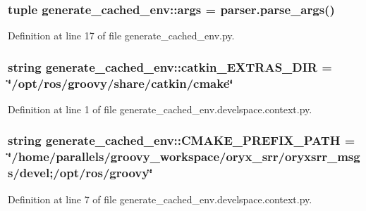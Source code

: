 \subsubsection[{args}]{\setlength{\rightskip}{0pt plus 5cm}tuple {\bf generate\-\_\-cached\-\_\-env\-::args} = parser.\-parse\-\_\-args()}\label{namespacegenerate__cached__env_a75c6158373e6fcee899e1337b8c59ad5}


\-Definition at line 17 of file generate\-\_\-cached\-\_\-env.\-py.

\subsubsection[{catkin\-\_\-\-E\-X\-T\-R\-A\-S\-\_\-\-D\-I\-R}]{\setlength{\rightskip}{0pt plus 5cm}string {\bf generate\-\_\-cached\-\_\-env\-::catkin\-\_\-\-E\-X\-T\-R\-A\-S\-\_\-\-D\-I\-R} = \char`\"{}/opt/ros/groovy/share/catkin/cmake\char`\"{}}\label{namespacegenerate__cached__env_a9c24e1b675ff632367a8b8f71cdccf13}


\-Definition at line 1 of file generate\-\_\-cached\-\_\-env.\-develspace.\-context.\-py.

\subsubsection[{\-C\-M\-A\-K\-E\-\_\-\-P\-R\-E\-F\-I\-X\-\_\-\-P\-A\-T\-H}]{\setlength{\rightskip}{0pt plus 5cm}string {\bf generate\-\_\-cached\-\_\-env\-::\-C\-M\-A\-K\-E\-\_\-\-P\-R\-E\-F\-I\-X\-\_\-\-P\-A\-T\-H} = \char`\"{}/home/parallels/groovy\-\_\-workspace/oryx\-\_\-srr/oryxsrr\-\_\-msgs/devel;/opt/ros/groovy\char`\"{}}\label{namespacegenerate__cached__env_a5febf1390e491671a2bd270eb18aaec9}


\-Definition at line 7 of file generate\-\_\-cached\-\_\-env.\-develspace.\-context.\-py.

